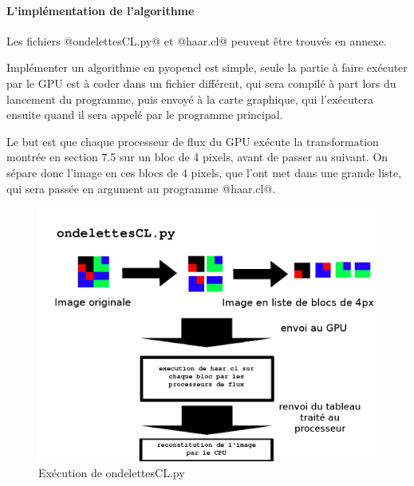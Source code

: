 \paragraph{L'implémentation de l'algorithme}

Les fichiers @ondelettesCL.py@ et @haar.cl@ peuvent être trouvés en annexe.

Implémenter un algorithme en pyopencl est simple, seule la partie à faire exécuter par le GPU est à coder dans un fichier différent, qui sera compilé à part lors du lancement du programme, puis envoyé à la carte graphique, qui l'exécutera ensuite quand il sera appelé par le programme principal. 

Le but est que chaque processeur de flux du GPU exécute la transformation montrée en section 7.5 sur un bloc de 4 pixels, avant de passer au suivant. On sépare donc l'image en ces blocs de 4 pixels, que l'ont met dans une grande liste, qui sera passée en argument au programme @haar.cl@.

\begin{figure}[!h]
\centering
\includegraphics[scale=0.5]{images/haarcl.png}
\caption{Exécution de ondelettesCL.py}
\label{haarcl}
\end{figure}

